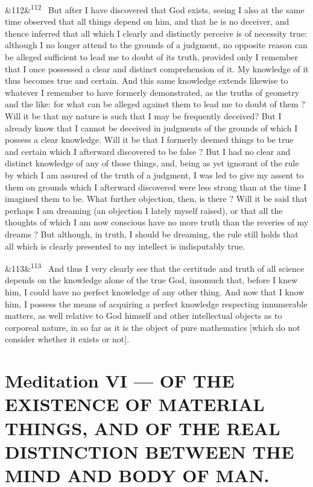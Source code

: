 \documentclass[12pt]{article}
\newcommand{\para}[1][]{\par\noindent\ifx&#1&\else\textsuperscript{\footnotesize #1}~\fi}
\begin{document}
\para[112] But after I have discovered that God exists, seeing I also at the same time observed that all things depend on him, and that he is no deceiver, and thence inferred that all which I clearly and distinctly perceive is of necessity true: although I no longer attend to the grounds of a judgment, no opposite reason can be alleged sufficient to lead me to doubt of its truth, provided only I remember that I once possessed a clear and distinct comprehension of it. My knowledge of it thus becomes true and certain. And this same knowledge extends likewise to whatever I remember to have formerly demonstrated, as the truths of geometry and the like: for what can be alleged against them to lead me to doubt of them ? Will it be that my nature is such that I may be frequently deceived? But I already know that I cannot be deceived in judgments of the grounds of which I possess a clear knowledge. Will it be that I formerly deemed things to be true and certain which I afterward discovered to be false ? But I had no clear and distinct knowledge of any of those things, and, being as yet ignorant of the rule by which I am assured of the truth of a judgment, I was led to give my assent to them on grounds which I afterward discovered were less strong than at the time I imagined them to be. What further objection, then, is there ? Will it be said that perhaps I am dreaming (an objection I lately myself raised), or that all the thoughts of which I am now conscious have no more truth than the reveries of my dreams ? But although, in truth, I should be dreaming, the rule still holds that all which is clearly presented to my intellect is indisputably true.

\para[113] And thus I very clearly see that the certitude and truth of all science depends on the knowledge alone of the true God, insomuch that, before I knew him, I could have no perfect knowledge of any other thing. And now that I know him, I possess the means of acquiring a perfect knowledge respecting innumerable matters, as well relative to God himself and other intellectual objects as to corporeal nature, in so far as it is the object of pure mathematics [which do not consider whether it exists or not].

\section*{Meditation VI --- OF THE EXISTENCE OF MATERIAL THINGS, AND OF THE REAL DISTINCTION BETWEEN THE MIND AND BODY OF MAN.}
\end{document}
